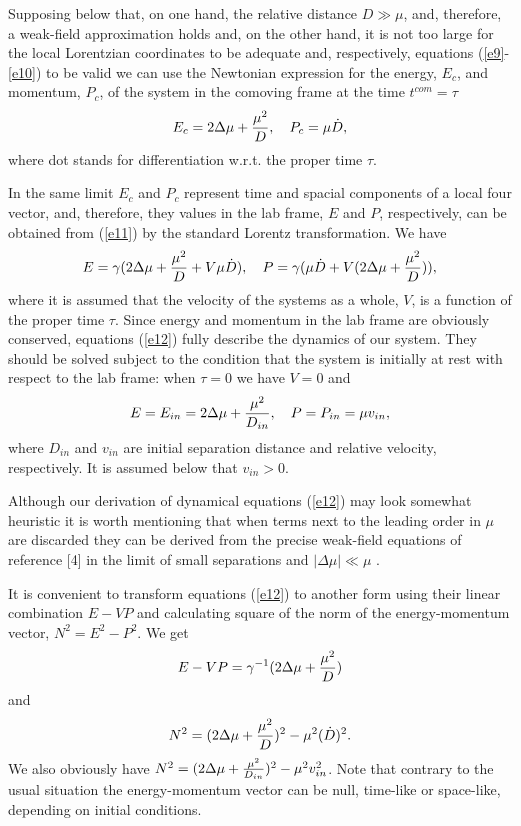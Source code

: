 \documentclass[aip,nofootinbib]{revtex4}
\begin{document}
Supposing  below that, on one hand, the relative distance $D \gg
\mu$, and, therefore, a weak-field approximation holds and, on the
other hand, it is not too large for the local Lorentzian
coordinates to be adequate and, respectively, equations
(\ref{e9}-\ref{e10}) to be valid we can use the Newtonian
expression for the energy, $E_c$, and momentum, $P_c$, of the
system in the comoving frame at the time $t^{com}=\tau$
\begin{equation}
E_c=2\Delta \mu +{\mu^2\over D}, \quad P_c=\mu \dot D, \label{e11}
\end{equation}
where dot stands for differentiation w.r.t. the proper time
$\tau$.

In the same limit $E_c$ and $P_c$ represent time and spacial
components of a local four vector, and, therefore, they values in
the lab frame, $E$ and $P$, respectively, can be obtained from
(\ref{e11}) by the standard Lorentz transformation. We have
\begin{equation}
E=\gamma (2\Delta \mu +{\mu^2\over D} + V\mu \dot D), \quad
P=\gamma ( \mu \dot D + V(2\Delta \mu +{\mu^2\over D})),
\label{e12}
\end{equation}
where it is assumed that the velocity of the systems as a whole,
$V$, is a function of the proper time $\tau $. Since energy and
momentum in the lab frame are obviously conserved, equations
(\ref{e12}) fully describe the dynamics of our system. They should
be solved subject to the condition that the system is initially at
rest with respect to the lab frame: when $\tau =0$ we have $V=0$
and \begin{equation} E=E_{in}=2\Delta \mu +{\mu^2\over D_{in}},
\quad P=P_{in}= \mu v_{in}, \label{e12a} \end{equation}
 where $D_{in}$ and $v_{in}$ are initial separation distance and relative
velocity, respectively. It is assumed below that $v_{in} > 0$.

Although our derivation of dynamical equations (\ref{e12}) may
look somewhat heuristic it is worth mentioning that when terms
next to the leading order in $\mu $ are discarded they can be
derived from the precise weak-field equations of reference [4] in
the limit of small separations and $|\Delta \mu | \ll \mu$ .



It is convenient to transform equations (\ref{e12}) to another
form using their linear combination $E-VP$ and calculating square
of the norm of the energy-momentum vector, $N^{2}=E^2-P^2$. We get
\begin{equation}
E-VP=\gamma^{-1}(2\Delta \mu +{\mu^2\over D}) \label{e13}
\end{equation}
and
\begin{equation}
N^{2}= (2\Delta \mu +{\mu^2\over D})^{2}-\mu^{2}(\dot D)^2.
\label{e14}
\end{equation}
We also obviously have $N^{2}=(2\Delta \mu +{\mu^2\over
D_{in}})^{2}-\mu^{2}v_{in}^2$. Note that contrary to the usual
situation the energy-momentum vector can be null, time-like or
space-like, depending on initial conditions.
\end{document}

